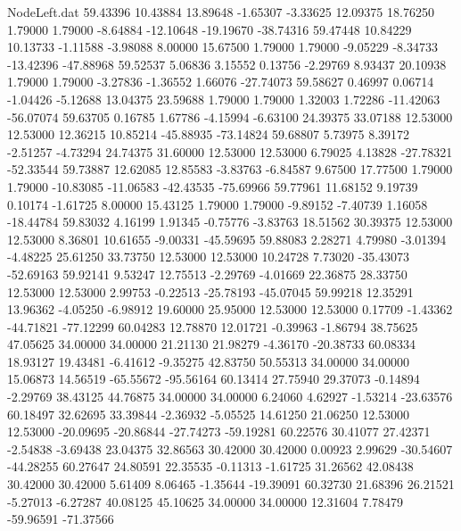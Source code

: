 \begin{filecontents}{NodeLeft.dat}
  59.43396   10.43884   13.89648    -1.65307   -3.33625   12.09375   18.76250    1.79000    1.79000   -8.64884  -12.10648  -19.19670  -38.74316
  59.47448   10.84229   10.13733    -1.11588   -3.98088    8.00000   15.67500    1.79000    1.79000   -9.05229   -8.34733  -13.42396  -47.88968
  59.52537    5.06836    3.15552     0.13756   -2.29769    8.93437   20.10938    1.79000    1.79000   -3.27836   -1.36552    1.66076  -27.74073
  59.58627    0.46997    0.06714    -1.04426   -5.12688   13.04375   23.59688    1.79000    1.79000    1.32003    1.72286  -11.42063  -56.07074
  59.63705    0.16785    1.67786    -4.15994   -6.63100   24.39375   33.07188   12.53000   12.53000   12.36215   10.85214  -45.88935  -73.14824
  59.68807    5.73975    8.39172    -2.51257   -4.73294   24.74375   31.60000   12.53000   12.53000    6.79025    4.13828  -27.78321  -52.33544
  59.73887   12.62085   12.85583    -3.83763   -6.84587    9.67500   17.77500    1.79000    1.79000  -10.83085  -11.06583  -42.43535  -75.69966
  59.77961   11.68152    9.19739     0.10174   -1.61725    8.00000   15.43125    1.79000    1.79000   -9.89152   -7.40739    1.16058  -18.44784
  59.83032    4.16199    1.91345    -0.75776   -3.83763   18.51562   30.39375   12.53000   12.53000    8.36801   10.61655   -9.00331  -45.59695
  59.88083    2.28271    4.79980    -3.01394   -4.48225   25.61250   33.73750   12.53000   12.53000   10.24728    7.73020  -35.43073  -52.69163
  59.92141    9.53247   12.75513    -2.29769   -4.01669   22.36875   28.33750   12.53000   12.53000    2.99753   -0.22513  -25.78193  -45.07045
  59.99218   12.35291   13.96362    -4.05250   -6.98912   19.60000   25.95000   12.53000   12.53000    0.17709   -1.43362  -44.71821  -77.12299
  60.04283   12.78870   12.01721    -0.39963   -1.86794   38.75625   47.05625   34.00000   34.00000   21.21130   21.98279   -4.36170  -20.38733
  60.08334   18.93127   19.43481    -6.41612   -9.35275   42.83750   50.55313   34.00000   34.00000   15.06873   14.56519  -65.55672  -95.56164
  60.13414   27.75940   29.37073    -0.14894   -2.29769   38.43125   44.76875   34.00000   34.00000    6.24060    4.62927   -1.53214  -23.63576
  60.18497   32.62695   33.39844    -2.36932   -5.05525   14.61250   21.06250   12.53000   12.53000  -20.09695  -20.86844  -27.74273  -59.19281
  60.22576   30.41077   27.42371    -2.54838   -3.69438   23.04375   32.86563   30.42000   30.42000    0.00923    2.99629  -30.54607  -44.28255
  60.27647   24.80591   22.35535    -0.11313   -1.61725   31.26562   42.08438   30.42000   30.42000    5.61409    8.06465   -1.35644  -19.39091
  60.32730   21.68396   26.21521    -5.27013   -6.27287   40.08125   45.10625   34.00000   34.00000   12.31604    7.78479  -59.96591  -71.37566

\end{filecontents}
